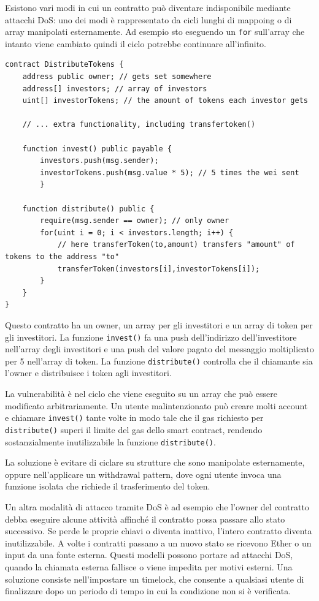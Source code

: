 Esistono vari modi in cui un contratto può diventare indisponibile mediante attacchi DoS: uno dei modi è rappresentato da cicli lunghi di mappoing o di array manipolati esternamente. Ad esempio sto eseguendo un \texttt{for} sull'array che intanto viene cambiato quindi il ciclo potrebbe continuare all'infinito.
\begin{lstlisting}[language=Solidity]
contract DistributeTokens {
    address public owner; // gets set somewhere
    address[] investors; // array of investors
    uint[] investorTokens; // the amount of tokens each investor gets
    
    // ... extra functionality, including transfertoken()
    
    function invest() public payable {
        investors.push(msg.sender);
        investorTokens.push(msg.value * 5); // 5 times the wei sent
        }
    
    function distribute() public {
        require(msg.sender == owner); // only owner
        for(uint i = 0; i < investors.length; i++) { 
            // here transferToken(to,amount) transfers "amount" of tokens to the address "to"
            transferToken(investors[i],investorTokens[i]); 
        }
    }
}
\end{lstlisting}
Questo contratto ha un owner, un array per gli investitori e un array di token per gli investitori. La funzione \texttt{invest()} fa una push dell'indirizzo dell'investitore nell'array degli investitori e una push del valore pagato del messaggio moltiplicato per 5 nell'array di token. La funzione \texttt{distribute()} controlla che il chiamante sia l'owner e distribuisce i token agli investitori.

La vulnerabilità è nel ciclo che viene eseguito su un array che può essere modificato arbitrariamente. Un utente malintenzionato può creare molti account e chiamare \texttt{invest()} tante volte in modo tale che il gas richiesto per \texttt{distribute()} superi il limite del gas dello smart contract, rendendo sostanzialmente inutilizzabile la funzione \texttt{distribute()}.

La soluzione è evitare di ciclare su strutture che sono manipolate esternamente, oppure nell'applicare un withdrawal pattern, dove ogni utente invoca una funzione isolata che richiede il trasferimento del token.

\vspace{5mm}

Un altra modalità di attacco tramite DoS è ad esempio che l'owner del contratto debba eseguire alcune attività affinché il contratto possa passare allo stato successivo. Se perde le proprie chiavi o diventa inattivo, l'intero contratto diventa inutilizzabile. A volte i contratti passano a un nuovo stato se ricevono Ether o un input da una fonte esterna. Questi modelli possono portare ad attacchi DoS, quando la chiamata esterna fallisce o viene impedita per motivi esterni. Una soluzione consiste nell'impostare un timelock, che consente a qualsiasi utente di finalizzare dopo un periodo di tempo in cui la condizione non si è verificata.

